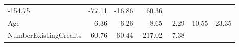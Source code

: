 \documentclass[]{article}
\begin{document}
\begin{longtable}[]{@{}lrrrrrr@{}}
\begin{minipage}[t]{0.08\columnwidth}
-154.75\strut
\end{minipage} & \begin{minipage}[t]{0.08\columnwidth}\raggedleft\strut
-77.11\strut
\end{minipage} & \begin{minipage}[t]{0.08\columnwidth}\raggedleft\strut
-16.86\strut
\end{minipage} & \begin{minipage}[t]{0.08\columnwidth}\raggedleft\strut
60.36\strut
\end{minipage}\tabularnewline
\begin{minipage}[t]{0.31\columnwidth}\raggedright\strut
Age\strut
\end{minipage} & \begin{minipage}[t]{0.10\columnwidth}\raggedleft\strut
6.36\strut
\end{minipage} & \begin{minipage}[t]{0.08\columnwidth}\raggedleft\strut
6.26\strut
\end{minipage} & \begin{minipage}[t]{0.08\columnwidth}\raggedleft\strut
-8.65\strut
\end{minipage} & \begin{minipage}[t]{0.08\columnwidth}\raggedleft\strut
2.29\strut
\end{minipage} & \begin{minipage}[t]{0.08\columnwidth}\raggedleft\strut
10.55\strut
\end{minipage} & \begin{minipage}[t]{0.08\columnwidth}\raggedleft\strut
23.35\strut
\end{minipage}\tabularnewline
\begin{minipage}[t]{0.31\columnwidth}\raggedright\strut
NumberExistingCredits\strut
\end{minipage} & \begin{minipage}[t]{0.10\columnwidth}\raggedleft\strut
60.76\strut
\end{minipage} & \begin{minipage}[t]{0.08\columnwidth}\raggedleft\strut
60.44\strut
\end{minipage} & \begin{minipage}[t]{0.08\columnwidth}\raggedleft\strut
-217.02\strut
\end{minipage} & \begin{minipage}[t]{0.08\columnwidth}\raggedleft\strut
-7.38\strut
\end{minipage} & \begin{minipage}[t]{0.08\columnwidth}\raggedleft\strut

\end{minipage}
\end{longtable}
\end{document}

